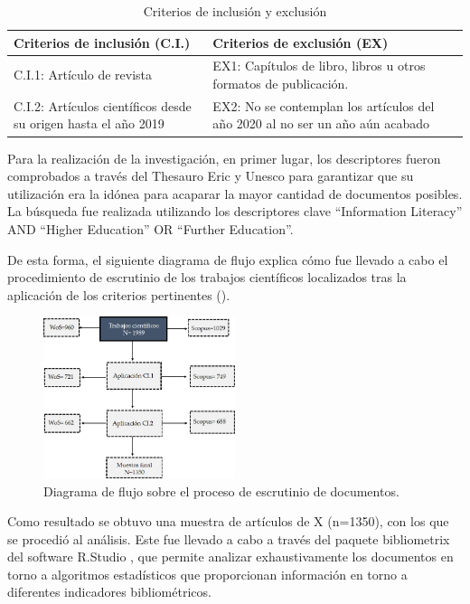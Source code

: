 \documentclass{textolivre}
\begin{document}
\begin{table}[htpb]
\caption{Criterios de inclusión y exclusión}
\label{tab1}
\scriptsize
\begin{tabular}{p{}p{}}
\toprule 
Criterios de inclusión (C.I.) & Criterios de exclusión (EX)
\\
\midrule
C.I.1: Artículo de revista & EX1: Capítulos de libro, libros u otros formatos de publicación.
\\
C.I.2: Artículos científicos desde su origen hasta el año 2019 & EX2: No se contemplan los artículos del año 2020 al no ser un año aún acabado
\\
\bottomrule
\end{tabular}
\end{table}

Para la realización de la investigación, en primer lugar, los descriptores fueron comprobados a través del Thesauro Eric y Unesco para garantizar que su utilización era la idónea para acaparar la mayor cantidad de documentos posibles. La búsqueda fue realizada utilizando los descriptores clave “Information Literacy” AND “Higher Education”  OR “Further Education”.

De esta forma, el siguiente diagrama de flujo explica cómo fue llevado a cabo el procedimiento de escrutinio de los trabajos científicos localizados tras la aplicación de los criterios pertinentes ().

\begin{figure}[h!]
 \centering
 \includegraphics[width=0.5\textwidth]{fig1.png}
 \caption{Diagrama de flujo sobre el proceso de escrutinio de documentos.}
 \label{fig1}
\end{figure}

Como resultado se obtuvo una muestra de artículos de X (n=1350), con los que se procedió al análisis. Este fue llevado a cabo a través del paquete bibliometrix del software R.Studio \cite{aria2017}, %
que permite analizar exhaustivamente los documentos en torno a algoritmos estadísticos  que proporcionan información en torno a diferentes indicadores bibliométricos.
\end{document}
